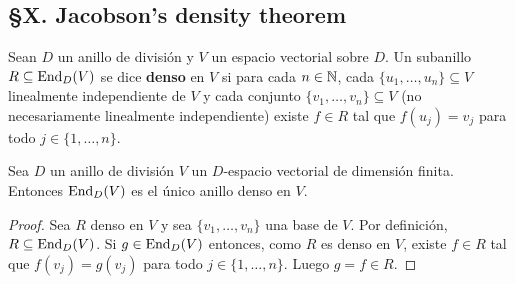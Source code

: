 \chapter{}

\section*{\S X. Jacobson's density theorem}

\begin{definition}
	Sean $D$ un anillo de división y $V$ un espacio vectorial sobre $D$. Un
	subanillo $R\subseteq\operatorname{End}_D(V)$ se dice \textbf{denso} en $V$ si para cada
	$n\in\mathbb{N}$, cada $\{u_1,\dots,u_n\}\subseteq V$ linealmente independiente de
	$V$ y cada conjunto $\{v_1,\dots,v_n\}\subseteq V$ (no necesariamente
	linealmente independiente) existe $f\in R$ tal que $f(u_j)=v_j$ para todo
	$j\in\{1,\dots,n\}$.
\end{definition}

%
%

\begin{lemma}
	\label{lem:unico_denso}
	Sea $D$ un anillo de división 
	$V$ un $D$-espacio vectorial de dimensión finita. Entonces $\operatorname{End}_D(V)$ es
	el único anillo denso en $V$.
\end{lemma}

\begin{proof}
	Sea $R$ denso en $V$ y sea $\{v_1,\dots,v_n\}$ una base de $V$. Por
	definición, $R\subseteq\operatorname{End}_D(V)$. Si $g\in\operatorname{End}_D(V)$ entonces, como $R$ es
	denso en $V$, existe $f\in R$ tal que $f(v_j)=g(v_j)$ para todo
	$j\in\{1,\dots,n\}$. Luego $g=f\in R$.
\end{proof}

